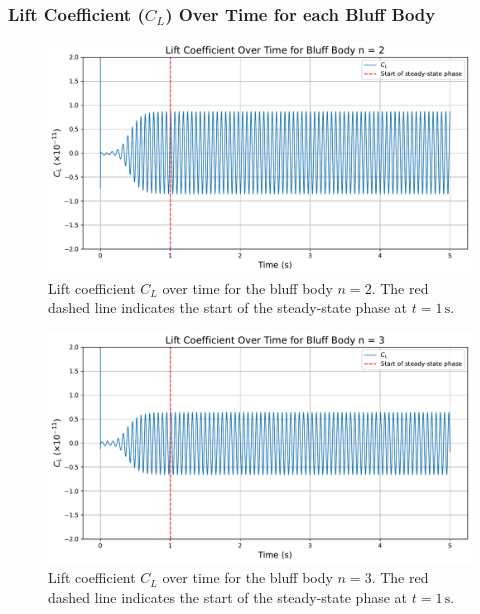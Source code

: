 \subsubsection{Lift Coefficient ($C_L$) Over Time for each Bluff Body}

\begin{figure}[H]
	\centering
	\includegraphics[width=\textwidth]{images/2face_graph}
	\caption{Lift coefficient $C_L$ over time for the bluff body $n=2$. The red dashed line indicates the start of the steady-state phase at $t = 1\,\mathrm{s}$.}
	\label{fig:2FaceGraph}
\end{figure}

\begin{figure}[H]
	\centering
	\includegraphics[width=\textwidth]{images/3face_graph}
	\caption{Lift coefficient $C_L$ over time for the bluff body $n=3$. The red dashed line indicates the start of the steady-state phase at $t = 1\,\mathrm{s}$.}
	\label{fig:3FaceGraph} 
\end{figure}

